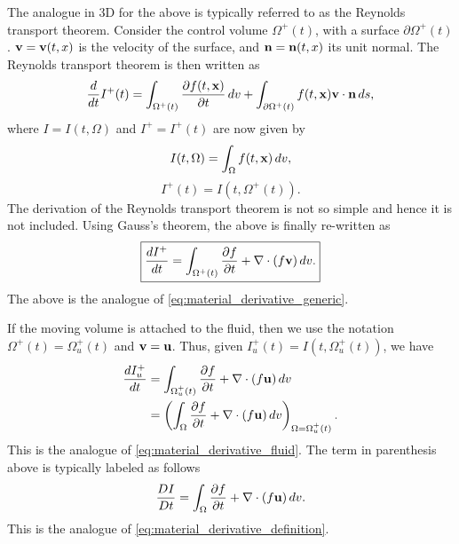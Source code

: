 \documentclass[oneside,a4paper,11pt]{report}
\begin{document}
The analogue in 3D for the above is typically referred to as the Reynolds transport theorem. Consider the control volume $\Omega^+(t)$, with a surface $\partial \Omega^+(t)$. $\mathbf{v} = \mathbf{v}(t,x)$ is the velocity of the surface, and $\mathbf{n} = \mathbf{n}(t,x)$ its unit normal. The Reynolds transport theorem is then written as 
\begin{equation}
  \frac{d}{dt} I^+(t) = \int_{\Omega^+(t)} \frac{\partial f(t,\mathbf{x})}{\partial t} \, dv + \int_{\partial \Omega^+(t)} f(t,\mathbf{x}) \mathbf{v} \cdot \mathbf{n} \, ds,
\end{equation}
where $I = I(t,\Omega)$ and $I^+ = I^+(t)$ are now given by  
\begin{equation}
    I(t,\Omega) = \int_\Omega f(t,\mathbf{x}) \,dv,
\end{equation}
\begin{equation}
    I^+(t) = I(t,\Omega^+(t)).
\end{equation}
The derivation of the Reynolds transport theorem is not so simple and hence it is not included. Using Gauss's theorem, the above is finally re-written as
\begin{equation}
\label{eq:reynolds_transport_theorem_generic}
\boxed{
  \frac{d I^+}{dt} = \int_{\Omega^+(t)} \frac{\partial f}{\partial t} + \nabla \cdot (f \mathbf{v} ) \, dv .
}
\end{equation}
The above is the analogue of \cref{eq:material_derivative_generic}. 

If the moving volume is attached to the fluid, then we use the notation $\Omega^+(t) = \Omega^+_u(t)$ and $\mathbf{v} = \mathbf{u}$. Thus, given $I^+_u(t) = I(t,\Omega^+_u(t))$, we have
\begin{align}
\label{eq:reynolds_transport_theorem_fluid}
  \frac{d I^+_u}{dt} &=  \int_{\Omega^+_u(t)} \frac{\partial f}{\partial t} + \nabla \cdot ( f \mathbf{u} ) \, dv  \nonumber \\
  &=\left ( \int_{\Omega} \frac{\partial f}{\partial t} + \nabla \cdot ( f \mathbf{u} ) \, dv \right)_{\Omega = \Omega^+_u(t)}.
\end{align}
This is the analogue of \cref{eq:material_derivative_fluid}. The term in parenthesis above is typically labeled as follows
\begin{equation}
    \frac{DI}{Dt} = \int_{\Omega} \frac{\partial f}{\partial t} + \nabla \cdot ( f \mathbf{u} ) \, dv.
\end{equation}
This is the analogue of \cref{eq:material_derivative_definition}.

\end{document}
